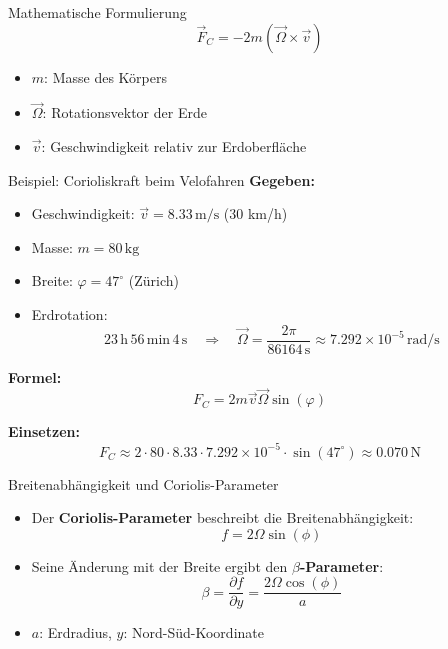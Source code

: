 \begin{frame}{Mathematische Formulierung}
	\begin{equation*}
		\vec{F}_C = -2m (\vec{\Omega} \times \vec{v})
	\end{equation*}
	\vspace{0.5cm}
	\begin{itemize}
		\item \( m \): Masse des Körpers
		\item \( \vec{\Omega} \): Rotationsvektor der Erde
		\item \( \vec{v} \): Geschwindigkeit relativ zur Erdoberfläche
	\end{itemize}
\end{frame}

\begin{frame}{Beispiel: Corioliskraft beim Velofahren}
	\textbf{Gegeben:}
	\begin{itemize}
		\item Geschwindigkeit: \( \vec{v} = 8.33\,\mathrm{m/s} \) (30 km/h)
		\item Masse: \( m = 80\,\mathrm{kg} \)
		\item Breite: \( \varphi = 47^\circ \) (Zürich)
		\item Erdrotation:
		      \[
			      23\,\mathrm{h}\,56\,\mathrm{min}\,4\,\mathrm{s} \quad\Rightarrow\quad
			      \vec{\Omega} = \frac{2\pi}{86164\,\mathrm{s}} \approx 7.292 \times 10^{-5}\,\mathrm{rad/s}
		      \]
	\end{itemize}

	\vspace{0.3cm}
	\textbf{Formel:}
	\[
		F_C = 2 m \vec{v} \vec{\Omega} \sin(\varphi)
	\]

	\vspace{0.3cm}
	\textbf{Einsetzen:}
	\[
		F_C \approx 2 \cdot 80 \cdot 8.33 \cdot 7.292 \times 10^{-5} \cdot \sin(47^\circ)
		\approx 0.070\, \mathrm{N}
	\]

\end{frame}


\begin{frame}{Breitenabhängigkeit und Coriolis-Parameter}
	\begin{itemize}
		\item Der \textbf{Coriolis-Parameter} beschreibt die Breitenabhängigkeit:
		      \[
			      f = 2 \Omega \sin(\phi)
		      \]
		\item Seine Änderung mit der Breite ergibt den \textbf{\(\beta\)-Parameter}:
		      \[
			      \beta = \frac{\partial f}{\partial y} = \frac{2 \Omega \cos(\phi)}{a}
		      \]
		\item \(a\): Erdradius, \quad \(y\): Nord-Süd-Koordinate
	\end{itemize}
\end{frame}

